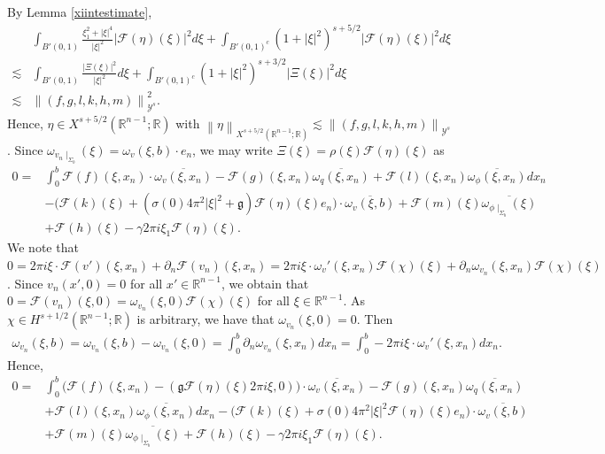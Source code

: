 \documentclass[11pt,letterpaper,reqno]{amsart}
\numberwithin{equation}{section}
\newcommand{\abs}[1]{\left\lvert#1\right\rvert}
\newcommand{\norm}[1]{\left\lVert#1\right\rVert}
\begin{document}
By Lemma \ref{xiintestimate},
\begin{align}
    &\int_{B'(0,1)}\frac{\xi_{1}^{2}+\abs{\xi}^{4}}{\abs{\xi}^{2}}\abs{\mathcal{F}(\eta)(\xi)}^{2}d\xi+\int_{B'(0,1)^{c}}(1+\abs{\xi}^{2})^{s+5/2}\abs{\mathcal{F}(\eta)(\xi)}^{2}d\xi \nonumber \\
    \lesssim&\int_{B'(0,1)}\frac{\abs{\Xi(\xi)}^{2}}{\abs{\xi}^{2}}d\xi +\int_{B'(0,1)^{c}}(1+\abs{\xi}^{2})^{s+3/2}\abs{\Xi(\xi)}^{2}d\xi \nonumber\\
    \lesssim&\norm{(f,g,l,k,h,m)}_{\mathcal{Y}^{s}}^{2}.
\end{align}
Hence, \(\eta \in X^{s+5/2}(\mathbb{R}^{n-1};\mathbb{R})\) with \(\norm{\eta}_{X^{s+5/2}(\mathbb{R}^{n-1};\mathbb{R})} \lesssim \norm{(f,g,l,k,h,m)}_{\mathcal{Y}^{s}}\). Since \(\omega_{v_{n}\mid_{\Sigma_{b}}}(\xi)=\omega_{v}(\xi,b) \cdot e_{n}\), we may write \(\Xi(\xi)=\rho(\xi)\mathcal{F}(\eta)(\xi)\) as
\begin{align}
    0=&\int_{0}^{b}\mathcal{F}(f)(\xi,x_{n})\cdot\overline{\omega_{v}(\xi,x_{n})}-\mathcal{F}(g)(\xi,x_{n})\overline{\omega_{q}(\xi,x_{n})}+\mathcal{F}(l)(\xi,x_{n})\overline{\omega_{\phi}(\xi,x_{n})}dx_{n} \nonumber \\
    &-\biggl(\mathcal{F}(k)(\xi)+(\sigma(0)4\pi^{2}\abs{\xi}^{2}+\mathfrak{g})\mathcal{F}(\eta)(\xi)e_{n}\biggr)\cdot \overline{\omega_{v}(\xi,b)}+\mathcal{F}(m)(\xi)\overline{\omega_{\phi \mid_{\Sigma_{b}}}(\xi)} \nonumber\\
    &+\mathcal{F}(h)(\xi)-\gamma2\pi i \xi_{1}\mathcal{F}(\eta)(\xi).
\end{align}
We note that \(0=2\pi i \xi \cdot \mathcal{F}(v')(\xi,x_{n})+\partial_{n}\mathcal{F}(v_{n})(\xi,x_{n}) =2\pi i \xi \cdot \omega_{v}'(\xi,x_{n})\mathcal{F}(\chi)(\xi)+\partial_{n}\omega_{v_{n}}(\xi,x_{n})\mathcal{F}(\chi)(\xi)\). Since \(v_{n}(x',0)=0\) for all \(x' \in \mathbb{R}^{n-1}\), we obtain that \(0=\mathcal{F}(v_{n})(\xi,0)=\omega_{v_{n}}(\xi,0)\mathcal{F}(\chi)(\xi)\) for all \(\xi \in \mathbb{R}^{n-1}\). As \(\chi \in H^{s+1/2}(\mathbb{R}^{n-1};\mathbb{R})\) is arbitrary, we have that \(\omega_{v_{n}}(\xi,0)=0\). Then
\begin{align}
    \omega_{v_{n}}(\xi,b)=\omega_{v_{n}}(\xi,b)-\omega_{v_{n}}(\xi,0)=\int_{0}^{b}\partial_{n}\omega_{v_{n}}(\xi,x_{n})dx_{n}=\int_{0}^{b}-2\pi i \xi \cdot \omega_{v}'(\xi,x_{n})dx_{n}.
\end{align}
Hence,
\begin{align}
    0=&\int_{0}^{b}\biggl(\mathcal{F}(f)(\xi,x_{n})-(\mathfrak{g}\mathcal{F}(\eta)(\xi)2\pi i \xi,0)\biggr)\cdot \overline{\omega_{v}(\xi,x_{n})}-\mathcal{F}(g)(\xi,x_{n})\overline{\omega_{q}(\xi,x_{n})} \nonumber \\
    &+\mathcal{F}(l)(\xi,x_{n})\overline{\omega_{\phi}(\xi,x_{n})}dx_{n} -\biggl(\mathcal{F}(k)(\xi)+\sigma(0)4\pi^{2}\abs{\xi}^{2}\mathcal{F}(\eta)(\xi)e_{n}\biggr)\cdot \overline{\omega_{v}(\xi,b)} \nonumber \\
    &+\mathcal{F}(m)(\xi)\overline{\omega_{\phi\mid_{\Sigma_{b}}}(\xi)}+\mathcal{F}(h)(\xi) -\gamma 2\pi i \xi_{1}\mathcal{F}(\eta)(\xi). \label{line1}
\end{align}
\end{document}
